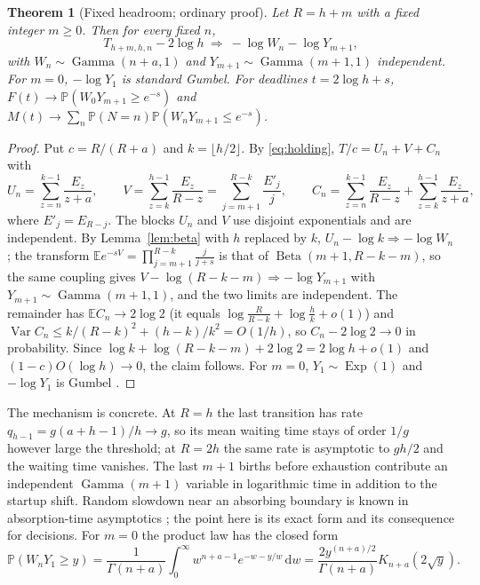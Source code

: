 \documentclass[11pt,a4paper]{article}
\theoremstyle{plain}
\newtheorem{theorem}{Theorem}[section]
\theoremstyle{definition}
\theoremstyle{remark}
\newcommand{\E}{\mathbb E}
\newcommand{\Prob}{\mathbb P}
\newcommand{\Var}{\operatorname{Var}}
\newcommand{\Gam}{\operatorname{Gamma}}
\newcommand{\Bet}{\operatorname{Beta}}
\newcommand{\Ex}{\operatorname{Exp}}
\newcommand{\dd}{\,\mathrm d}
\begin{document}
\begin{theorem}[Fixed headroom; ordinary proof]\label{thm:headroom}
Let $R=h+m$ with a fixed integer $m\ge0$. Then for every fixed $n$,
\[
T_{h+m,h,n}-2\log h\ \Rightarrow\ -\log W_n-\log Y_{m+1},
\]
with $W_n\sim\Gam(n+a,1)$ and $Y_{m+1}\sim\Gam(m+1,1)$ independent. For $m=0$, $-\log Y_1$ is standard Gumbel. For deadlines $t=2\log h+s$, $F(t)\to\Prob(W_0Y_{m+1}\ge e^{-s})$ and $M(t)\to\sum_n\Prob(N=n)\Prob(W_nY_{m+1}\le e^{-s})$.
\end{theorem}
\begin{proof}
Put $c=R/(R+a)$ and $k=\lfloor h/2\rfloor$. By \eqref{eq:holding}, $T/c=U_n+V+C_n$ with
\[
U_n=\sum_{z=n}^{k-1}\frac{E_z}{z+a},\qquad V=\sum_{z=k}^{h-1}\frac{E_z}{R-z}=\sum_{j=m+1}^{R-k}\frac{E'_j}{j},\qquad C_n=\sum_{z=n}^{k-1}\frac{E_z}{R-z}+\sum_{z=k}^{h-1}\frac{E_z}{z+a},
\]
where $E'_j=E_{R-j}$. The blocks $U_n$ and $V$ use disjoint exponentials and are independent. By Lemma~\ref{lem:beta} with $h$ replaced by $k$, $U_n-\log k\Rightarrow-\log W_n$; the transform $\E e^{-sV}=\prod_{j=m+1}^{R-k}\frac j{j+s}$ is that of $\Bet(m+1,R-k-m)$, so the same coupling gives $V-\log(R-k-m)\Rightarrow-\log Y_{m+1}$ with $Y_{m+1}\sim\Gam(m+1,1)$, and the two limits are independent. The remainder has $\E C_n\to2\log2$ (it equals $\log\frac R{R-k}+\log\frac hk+o(1)$) and $\Var C_n\le k/(R-k)^2+(h-k)/k^2=O(1/h)$, so $C_n-2\log2\to0$ in probability. Since $\log k+\log(R-k-m)+2\log2=2\log h+o(1)$ and $(1-c)O(\log h)\to0$, the claim follows. For $m=0$, $Y_1\sim\Ex(1)$ and $-\log Y_1$ is Gumbel \citep{erdosrenyi1961}.
\end{proof}
The mechanism is concrete. At $R=h$ the last transition has rate $q_{h-1}=g(a+h-1)/h\to g$, so its mean waiting time stays of order $1/g$ however large the threshold; at $R=2h$ the same rate is asymptotic to $gh/2$ and the waiting time vanishes. The last $m+1$ births before exhaustion contribute an independent $\Gam(m+1)$ variable in logarithmic time in addition to the startup shift. Random slowdown near an absorbing boundary is known in absorption-time asymptotics \citep{hathcock2022}; the point here is its exact form and its consequence for decisions. For $m=0$ the product law has the closed form
\begin{equation}\label{eq:bessel}
\Prob(W_nY_1\ge y)=\frac1{\Gamma(n+a)}\int_0^\infty w^{n+a-1}e^{-w-y/w}\dd w=\frac{2y^{(n+a)/2}}{\Gamma(n+a)}K_{n+a}(2\sqrt y).
\end{equation}
\end{document}
